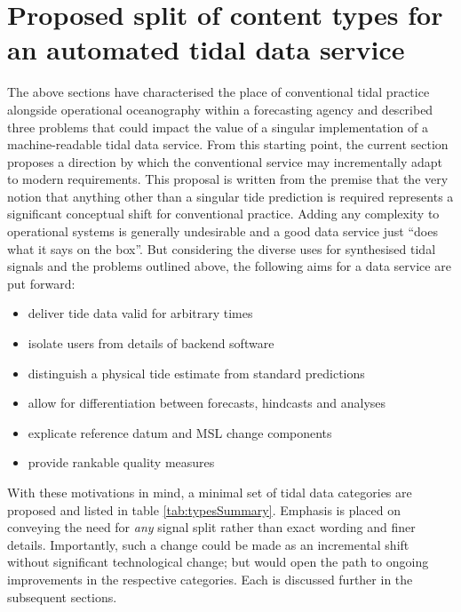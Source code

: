 \section{Proposed split of content types for an automated tidal data service}
\label{Sec:proposed}
The above sections have characterised the place of conventional tidal practice alongside operational oceanography within a forecasting agency and described three problems that could impact the value of a singular implementation of a machine-readable tidal data service.   From this starting point, the current section proposes a direction by which the conventional service may incrementally adapt to modern requirements.  This proposal is written from the premise that the very notion that anything other than a singular tide prediction is required represents a significant conceptual shift for conventional practice.
Adding any complexity to operational systems is generally undesirable and a good data service just ``does what it says on the box''.  But considering the diverse uses for synthesised tidal signals and the problems outlined above, the following aims for a data service are put forward: 
\begin{itemize}
    \item deliver tide data valid for arbitrary times
    \item isolate users from details of backend software 
    \item distinguish a physical tide estimate from standard predictions
    \item allow for differentiation between forecasts, hindcasts and analyses
    \item explicate reference datum and MSL change components
    \item provide rankable quality measures
\end{itemize}

With these motivations in mind, a minimal set of tidal data categories are proposed and listed in table \ref{tab:typesSummary}.   Emphasis is placed on conveying the need for \textit{any} signal split rather than exact wording and finer details.  Importantly, such a change could be made as an incremental shift without significant technological change; but would open the path to ongoing improvements in the respective categories. 
Each is discussed further in the subsequent sections.

